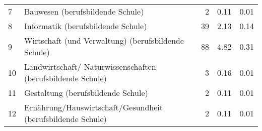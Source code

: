 \begin{longtable}{lXrrr}
     7 &
     \multicolumn{1}{X}{ Bauwesen (berufsbildende Schule)   } &


       \num{2} &
       \num[round-mode=places,round-precision=2]{0.11} &
         \num[round-mode=places,round-precision=2]{0.01} \\

     8 &
     \multicolumn{1}{X}{ Informatik (berufsbildende Schule)   } &


       \num{39} &
       \num[round-mode=places,round-precision=2]{2.13} &
         \num[round-mode=places,round-precision=2]{0.14} \\

     9 &
     \multicolumn{1}{X}{ Wirtschaft (und Verwaltung) (berufsbildende Schule)   } &


       \num{88} &
       \num[round-mode=places,round-precision=2]{4.82} &
         \num[round-mode=places,round-precision=2]{0.31} \\

     10 &
     \multicolumn{1}{X}{ Landwirtschaft/ Naturwissenschaften (berufsbildende Schule)   } &


       \num{3} &
       \num[round-mode=places,round-precision=2]{0.16} &
         \num[round-mode=places,round-precision=2]{0.01} \\

     11 &
     \multicolumn{1}{X}{ Gestaltung (berufsbildende Schule)   } &


       \num{2} &
       \num[round-mode=places,round-precision=2]{0.11} &
         \num[round-mode=places,round-precision=2]{0.01} \\

     12 &
     \multicolumn{1}{X}{ Ernährung/Hauswirtschaft/Gesundheit (berufsbildende Schule)   } &


       \num{2} &
       \num[round-mode=places,round-precision=2]{0.11} &
         \num[round-mode=places,round-precision=2]{0.01} \\


\end{longtable}
